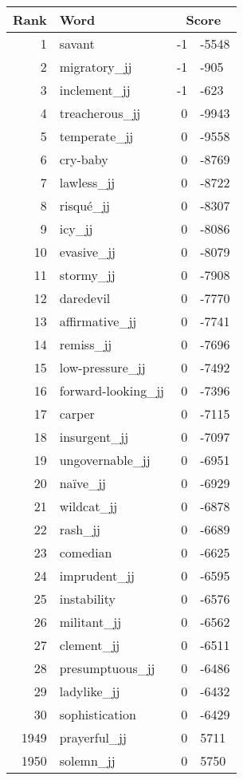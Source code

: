 \begin{longtable}[!htbp]{| rlr@{.}l |}
    \hline
    \textbf{Rank} & \textbf{Word} & \multicolumn{2}{c|}{\textbf{Score}} \\
    \hline
    \endhead
    1 & savant & -1 & -5548 \\
    2 & migratory\_jj & -1 & -905 \\
    3 & inclement\_jj & -1 & -623 \\
    4 & treacherous\_jj & 0 & -9943 \\
    5 & temperate\_jj & 0 & -9558 \\
    6 & cry-baby & 0 & -8769 \\
    7 & lawless\_jj & 0 & -8722 \\
    8 & risqué\_jj & 0 & -8307 \\
    9 & icy\_jj & 0 & -8086 \\
    10 & evasive\_jj & 0 & -8079 \\
    11 & stormy\_jj & 0 & -7908 \\
    12 & daredevil & 0 & -7770 \\
    13 & affirmative\_jj & 0 & -7741 \\
    14 & remiss\_jj & 0 & -7696 \\
    15 & low-pressure\_jj & 0 & -7492 \\
    16 & forward-looking\_jj & 0 & -7396 \\
    17 & carper & 0 & -7115 \\
    18 & insurgent\_jj & 0 & -7097 \\
    19 & ungovernable\_jj & 0 & -6951 \\
    20 & naïve\_jj & 0 & -6929 \\
    21 & wildcat\_jj & 0 & -6878 \\
    22 & rash\_jj & 0 & -6689 \\
    23 & comedian & 0 & -6625 \\
    24 & imprudent\_jj & 0 & -6595 \\
    25 & instability & 0 & -6576 \\
    26 & militant\_jj & 0 & -6562 \\
    27 & clement\_jj & 0 & -6511 \\
    28 & presumptuous\_jj & 0 & -6486 \\
    29 & ladylike\_jj & 0 & -6432 \\
    30 & sophistication & 0 & -6429 \\
    1949 & prayerful\_jj & 0 & 5711 \\
    1950 & solemn\_jj & 0 & 5750 \\

\end{longtable}
